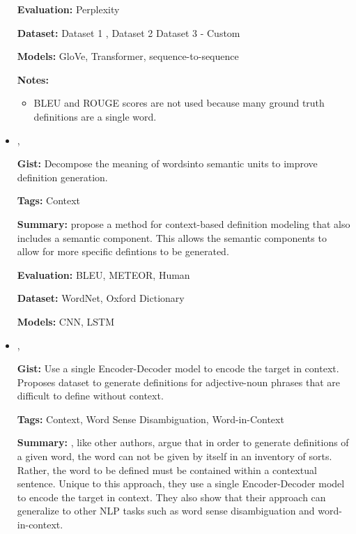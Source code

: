 \documentclass{article}[a4paper]
\newcommand{\bitem}[2]{
    \item[\cite{#1}]
        \textbf{\citetitle{#1}}

        \citeauthor{#1}, \citeyear{#1}
        \newline\newline
        {#2}
}%
\begin{document}
\begin{itemize}
{        \textbf{Evaluation:}
        Perplexity

        \textbf{Dataset:}
        Dataset 1 \cite{noraset_definition_2016},
        Dataset 2 \cite{gadetsky_conditional_2018}
        Dataset 3 - Custom

        \textbf{Models:}
        GloVe, Transformer, sequence-to-sequence

        \textbf{Notes:}
        \begin{itemize}
            \item BLEU and ROUGE scores are not used because many ground truth
                  definitions are a single word.
        \end{itemize}
    }%

    \bitem{li_explicit_2020}%
    {%
        \textbf{Gist:}
        Decompose the meaning of wordsinto semantic units to improve definition
        generation.

        \textbf{Tags:}
        Context

        \textbf{Summary:}
        \citeauthor{li_explicit_2020} propose a method for context-based
        definition modeling that also includes a semantic component. This allows
        the semantic components to allow for more specific defintions to be
        generated.

        \textbf{Evaluation:}
        BLEU, METEOR, Human

        \textbf{Dataset:}
        WordNet, Oxford Dictionary

        \textbf{Models:}
        CNN, LSTM
    }%

    \bitem{bevilacqua_generationary_2020}%
    {%
        \textbf{Gist:}
        Use a single Encoder-Decoder model to encode the target in context.
        Proposes dataset to generate definitions for adjective-noun phrases that
        are difficult to define without context.

        \textbf{Tags:}
        Context, Word Sense Disambiguation, Word-in-Context

        \textbf{Summary:}
        \citeauthor{bevilacqua_generationary_2020}, like other authors, argue
        that in order to generate definitions of a given word, the word can not
        be given by itself in an inventory of sorts. Rather, the word to be
        defined must be contained within a contextual sentence. Unique to this
        approach, they use a single Encoder-Decoder model to encode the target
        in context. They also show that their approach can generalize to other
        NLP tasks such as word sense disambiguation and word-in-context.

}
\end{itemize}
\end{document}
